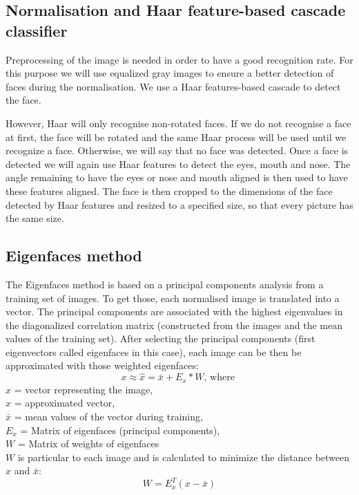 \subsection{Normalisation and Haar feature-based cascade classifier}
Preprocessing of the image is needed in order to have a good recognition rate. For this purpose we will use equalized gray images to ensure a better detection of faces during the normalisation. We use a Haar features-based cascade to detect the face.

However, Haar will only recognise non-rotated faces. If we do not recognise a face at first, the face will be rotated and the same Haar process will be used until we recognize a face. Otherwise, we will say that no face was detected. Once a face is detected we will again use Haar features to detect the eyes, mouth and nose. The angle remaining to have the eyes or nose and mouth aligned is then used to have these features aligned. The face is then cropped to the dimensions of the face detected by Haar features and resized to a specified size, so that every picture has the same size.

\subsection{Eigenfaces method}

The Eigenfaces method is based on a principal components analysis from a training set of images. To get those, each normalised image is translated into a vector. The principal components are associated with the highest eigenvalues in the diagonalized correlation matrix (constructed from the images and the mean values of the training set). After selecting the principal components (first eigenvectors called eigenfaces in this case), each image can be then be approximated with those weighted eigenfaces:
\begin{equation}
x \approx  \hat{x} = \bar{x} + E_{x} * W \textrm{, where } 
\end{equation}
$x$ = vector representing the image,\\
$\hat{x}$ = approximated vector,\\
$\bar{x}$ = mean values of the vector during training,\\
$E_{x}$ = Matrix of eigenfaces (principal components),\\
$W$ = Matrix of weights of eigenfaces\\

$W$ is particular to each image and is calculated to minimize the distance between $x$ and $\bar{x}$:
\begin{equation}
W = E_{x}^T (x-\bar{x}) 
\end{equation}

